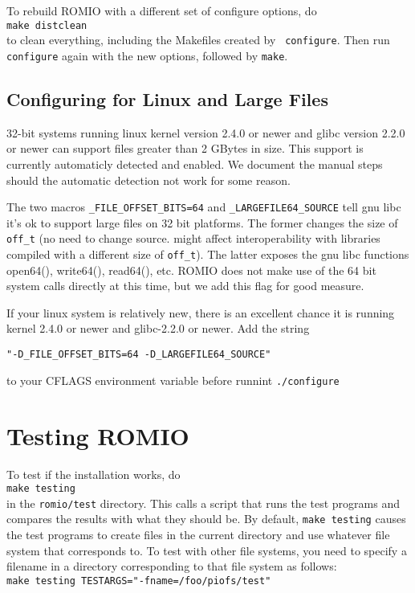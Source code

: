 To rebuild ROMIO with a different set of configure options, do\\
\hspace*{.4in} {\tt make distclean}\\
to clean everything, including the Makefiles created by {\tt
configure}.  Then run {\tt configure} again with the new options,
followed by {\tt make}.

\subsection{Configuring for Linux and Large Files }

32-bit systems running linux kernel version 2.4.0 or newer and glibc
version 2.2.0 or newer can support files greater than 2 GBytes in size.
This support is currently automaticly detected and enabled.  We document the
manual steps should the automatic detection not work for some reason.

The two macros {\tt\_FILE\_OFFSET\_BITS=64} and
{\tt\_LARGEFILE64\_SOURCE} tell gnu libc it's ok to support large files
on 32 bit platforms.  The former changes the size of {\tt off\_t} (no
need to change source.  might affect interoperability with libraries
compiled with a different size of {\tt off\_t}).   The latter exposes
the gnu libc functions open64(), write64(), read64(), etc.   ROMIO does
not make use of the 64 bit system calls directly at this time, but we
add this flag for good measure.  

If your linux system is relatively new, there is an excellent chance it
is running kernel 2.4.0 or newer and glibc-2.2.0 or newer.  Add the
string
\begin{verbatim}
"-D_FILE_OFFSET_BITS=64 -D_LARGEFILE64_SOURCE"
\end{verbatim}
to your CFLAGS environment variable before runnint {\tt./configure}

%
%
\section{Testing ROMIO}
To test if the installation works, do\\
\hspace*{.4in} {\tt make testing}\\
in the {\tt romio/test} directory. This calls a script that runs the test
programs and compares the results with what they should be. By
default, {\tt make testing} causes the test programs to create files in
the current directory and use whatever file system that corresponds
to. To test with other file systems, you need to specify a filename in
a directory corresponding to that file system as follows:\\
\hspace*{.4in} {\tt make testing TESTARGS="-fname=/foo/piofs/test"}



